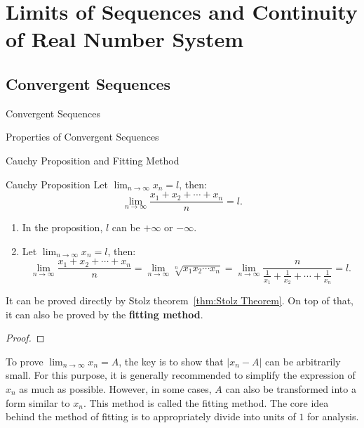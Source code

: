\documentclass[11pt]{../../TexTemplate/elegantbook}
\begin{document}
\chapter{Limits of Sequences and Continuity of Real Number System} 
\section{Convergent Sequences}
\begin{leftbarTitle}{Convergent Sequences}\end{leftbarTitle}

\begin{leftbarTitle}{Properties of Convergent Sequences}\end{leftbarTitle}



\begin{leftbarTitle}{Cauchy Proposition and Fitting Method}\end{leftbarTitle}
\begin{proposition}{Cauchy Proposition}\label{prop:Cauchy Proposition}
    Let \(\lim_{n \to \infty} x_n = l\), then:
    \[
        \lim_{n \to \infty} \frac{x_{1}+x_{2}+ \cdots +x_{n}}{n} = l.
    \]
\end{proposition}

\begin{note}
    \begin{enumerate}
        \item In the proposition, \(l\) can be \(+\infty\) or \(-\infty\).
        \item Let \(\lim_{n \to \infty} x_n = l\), then:
            \[
                \lim_{n \to \infty}\frac{x_{1}+x_{2}+ \cdots +x_{n}}{n}
                =\lim_{n \to \infty} \sqrt[n]{x_{1} x_{2} \cdots x_{n}} 
                =\lim_{n \to \infty} \frac{n}{\frac{1}{x_{1}} + \frac{1}{x_{2}} + \cdots + \frac{1}{x_{n}}}
                = l.
            \]
    \end{enumerate}
\end{note}

It can be proved directly by Stolz theorem~\ref{thm:Stolz Theorem}.
On top of that, it can also be proved by the \textbf{fitting method}.

\begin{proof}
    
\end{proof}

\begin{remark}
    To prove \(\lim_{n \to \infty} x_n = A\), 
    the key is to show that \(|x_n - A|\) can be arbitrarily small. 
    For this purpose, it is generally recommended to simplify the expression of \(x_n\) as much as possible. 
    However, in some cases, \(A\) can also be transformed into a form similar to \(x_n\). 
    This method is called the fitting method. 
    The core idea behind the method of fitting is to appropriately divide into units of \(1\) for analysis.
\end{remark}
\end{document}
